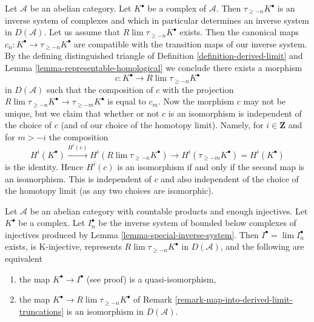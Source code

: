\begin{remark}
\label{remark-map-into-derived-limit-truncations}
Let $\mathcal{A}$ be an abelian category. Let $K^\bullet$ be a
complex of $\mathcal{A}$. Then $\tau_{\geq -n}K^\bullet$ is an
inverse system of complexes and which in particular determines
an inverse system in $D(\mathcal{A})$. Let us assume that
$R\lim \tau_{\geq -n}K^\bullet$ exists. Then the canonical maps
$c_n : K^\bullet \to \tau_{\geq -n}K^\bullet$ are compatible with the
transition maps of our inverse system. By the defining distinguished
triangle of Definition \ref{definition-derived-limit} and
Lemma \ref{lemma-representable-homological}
we conclude there exists a morphism
$$
c : K^\bullet \longrightarrow R\lim \tau_{\geq -n}K^\bullet
$$
in $D(\mathcal{A})$ such that the composition of $c$ with the projection
$R\lim \tau_{\geq -n}K^\bullet \to \tau_{\geq -m}K^\bullet$ is equal to $c_m$.
Now the morphism $c$ may not be unique, but we claim that whether or not
$c$ is an isomorphism is independent of the choice of $c$ (and of our choice
of the homotopy limit). Namely, for $i \in \mathbf{Z}$ and for $m > -i$
the composition
$$
H^i(K^\bullet) \xrightarrow{H^i(c)} H^i(R\lim \tau_{\geq -n}K^\bullet)
\to H^i(\tau_{\geq -m}K^\bullet) = H^i(K^\bullet)
$$
is the identity. Hence $H^i(c)$ is an isomorphism if and only if the
second map is an isomorphism. This is independent of $c$ and also
independent of the choice of the homotopy limit (as any two choices
are isomorphic).
\end{remark}

\begin{lemma}
\label{lemma-difficulty-K-injectives}
Let $\mathcal{A}$ be an abelian category with countable products and
enough injectives. Let $K^\bullet$ be a complex. Let $I_n^\bullet$ be
the inverse system of bounded below complexes of injectives produced by
Lemma \ref{lemma-special-inverse-system}. Then
$I^\bullet = \lim I_n^\bullet$ exists, is K-injective, represents
$R\lim \tau_{\geq -n}K^\bullet$ in $D(\mathcal{A})$,
and the following are equivalent
\begin{enumerate}
\item the map $K^\bullet \to I^\bullet$ (see proof) is a quasi-isomorphism,
\item the map $K^\bullet \to R\lim \tau_{\geq -n}K^\bullet$
of Remark \ref{remark-map-into-derived-limit-truncations}
is an isomorphism in $D(\mathcal{A})$.
\end{enumerate}
\end{lemma}

